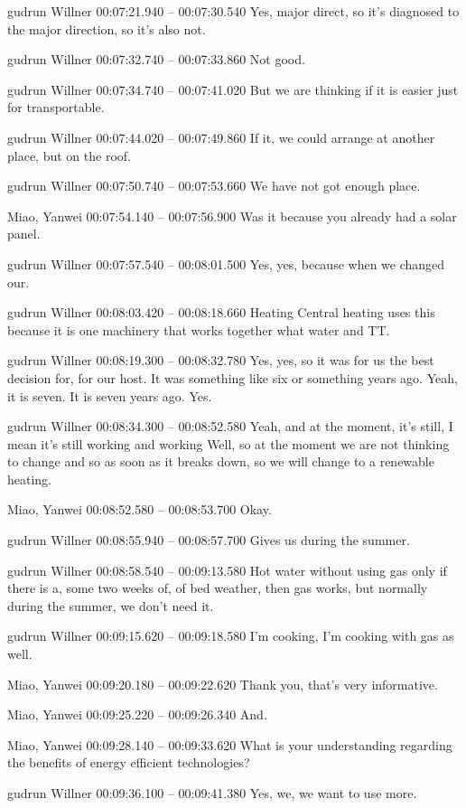 {gudrun Willner 00:07:21.940 -- 00:07:30.540
Yes, major direct, so it's diagnosed to the major direction, so it's also not.

gudrun Willner 00:07:32.740 -- 00:07:33.860
Not good.

gudrun Willner 00:07:34.740 -- 00:07:41.020
But we are thinking if it is easier just for transportable.

gudrun Willner 00:07:44.020 -- 00:07:49.860
If it, we could arrange at another place, but on the roof.

gudrun Willner 00:07:50.740 -- 00:07:53.660
We have not got enough place.

Miao, Yanwei 00:07:54.140 -- 00:07:56.900
Was it because you already had a solar panel.

gudrun Willner 00:07:57.540 -- 00:08:01.500
Yes, yes, because when we changed our.

gudrun Willner 00:08:03.420 -- 00:08:18.660
Heating Central heating uses this because it is one machinery that works together what water and TT.

gudrun Willner 00:08:19.300 -- 00:08:32.780
Yes, yes, so it was for us the best decision for, for our host. It was something like six or something years ago. Yeah, it is seven. It is seven years ago. Yes.

gudrun Willner 00:08:34.300 -- 00:08:52.580
Yeah, and at the moment, it's still, I mean it's still working and working Well, so at the moment we are not thinking to change and so as soon as it breaks down, so we will change to a renewable heating.

Miao, Yanwei 00:08:52.580 -- 00:08:53.700
Okay.

gudrun Willner 00:08:55.940 -- 00:08:57.700
Gives us during the summer.

gudrun Willner 00:08:58.540 -- 00:09:13.580
Hot water without using gas only if there is a, some two weeks of, of bed weather, then gas works, but normally during the summer, we don't need it.

gudrun Willner 00:09:15.620 -- 00:09:18.580
I'm cooking, I'm cooking with gas as well.

Miao, Yanwei 00:09:20.180 -- 00:09:22.620
Thank you, that's very informative.

Miao, Yanwei 00:09:25.220 -- 00:09:26.340
And.

Miao, Yanwei 00:09:28.140 -- 00:09:33.620
What is your understanding regarding the benefits of energy efficient technologies?

gudrun Willner 00:09:36.100 -- 00:09:41.380
Yes, we, we want to use more.

}
